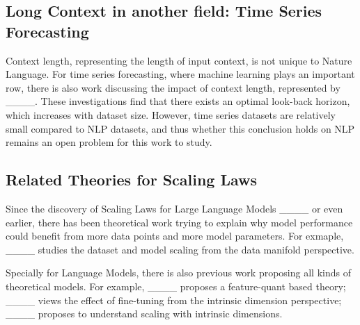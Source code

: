 \subsection{Long Context in another field: Time Series Forecasting}

Context length, representing the length of input context, is not unique to Nature Language. For time series forecasting, where machine learning plays an important row, there is also work discussing the impact of context length, represented by ____. These investigations find that there exists an optimal look-back horizon, which increases with dataset size. However, time series datasets are relatively small compared to NLP datasets, and thus whether this conclusion holds on NLP remains an open problem for this work to study.

\subsection{Related Theories for Scaling Laws}

Since the discovery of Scaling Laws for Large Language Models ____ or even earlier, there has been theoretical work trying to explain why model performance could benefit from more data points and more model parameters. For exmaple, ____ studies the dataset and model scaling from the data manifold perspective.

Specially for Language Models, there is also previous work proposing all kinds of theoretical models. For example, ____ proposes a feature-quant based theory; ____ views the effect of fine-tuning from the intrinsic dimension perspective; ____ proposes to understand scaling with intrinsic dimensions.